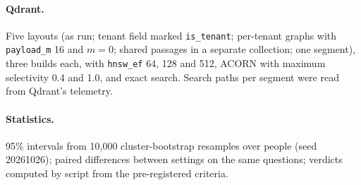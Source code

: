 \paragraph{Qdrant.} Five layouts (as run; tenant field marked \texttt{is\_tenant}; per-tenant graphs
with \texttt{payload\_m} 16 and $m = 0$; shared passages in a separate collection; one segment), three
builds each, with \texttt{hnsw\_ef} 64, 128 and 512, ACORN with maximum selectivity 0.4 and 1.0, and
exact search. Search paths per segment were read from Qdrant's telemetry.

\paragraph{Statistics.} 95\% intervals from 10,000 cluster-bootstrap resamples over people (seed
20261026); paired differences between settings on the same questions; verdicts computed by script
from the pre-registered criteria.
